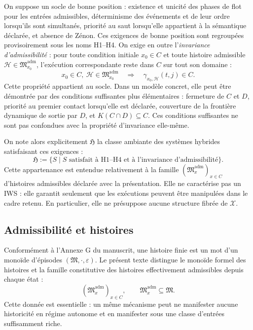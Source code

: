 \documentclass[11pt,a4paper]{article}
\theoremstyle{definition}
\theoremstyle{remark}
\newcommand{\Hyb}{\mathfrak H}
\newcommand{\X}{\mathcal X}
\newcommand{\M}{\mathfrak M}
\newcommand{\Madm}{\mathfrak M^{\mathrm{adm}}}
\begin{document}
On suppose un socle de bonne position : existence et unicité des phases de flot pour les entrées admissibles, déterminisme des événements et de leur ordre lorsqu'ils sont simultanés, priorité au saut lorsqu'elle appartient à la sémantique déclarée, et absence de Zénon. Ces exigences de bonne position sont regroupées provisoirement sous les noms H1--H4. On exige en outre l'\emph{invariance d'admissibilité} : pour toute condition initiale $x_0\in C$ et toute histoire admissible $\mathcal H\in\Madm_{x_0}$, l'exécution correspondante reste dans $C$ sur tout son domaine :
\[
\boxed{x_0\in C,\ \mathcal H\in\Madm_{x_0}
\quad\Longrightarrow\quad
\gamma_{x_0,\mathcal H}(t,j)\in C.}
\]
Cette propriété appartient au socle. Dans un modèle concret, elle peut être démontrée par des conditions suffisantes plus élémentaires : fermeture de $C$ et $D$, priorité au premier contact lorsqu'elle est déclarée, couverture de la frontière dynamique de sortie par $D$, et $K(C\cap D)\subseteq C$. Ces conditions suffisantes ne sont pas confondues avec la propriété d'invariance elle-même.

On note alors explicitement $\Hyb$ la classe ambiante des systèmes hybrides satisfaisant ces exigences :
\[
\boxed{\Hyb:=\bigl\{S\;\big|\;
\text{$S$ satisfait à H1--H4 et à l'invariance d'admissibilité}\bigr\}.}
\]
Cette appartenance est entendue relativement à la famille $ (\Madm_x)_{x\in C}$ d'histoires admissibles déclarée avec la présentation. Elle ne caractérise pas un IWS : elle garantit seulement que les exécutions peuvent être manipulées dans le cadre retenu. En particulier, elle ne présuppose aucune structure fibrée de $\X$.

\subsection{Admissibilité et histoires}

Conformément à l'Annexe G du manuscrit, une histoire finie est un mot d'un monoïde d'épisodes $(\M,\cdot,\varepsilon)$. Le présent texte distingue le monoïde formel des histoires et la famille constitutive des histoires effectivement admissibles depuis chaque état :
\[
\boxed{(\Madm_x)_{x\in C},\qquad \Madm_x\subseteq\M.}
\]
Cette donnée est essentielle : un même mécanisme peut ne manifester aucune historicité en régime autonome et en manifester sous une classe d'entrées suffisamment riche.
\end{document}
